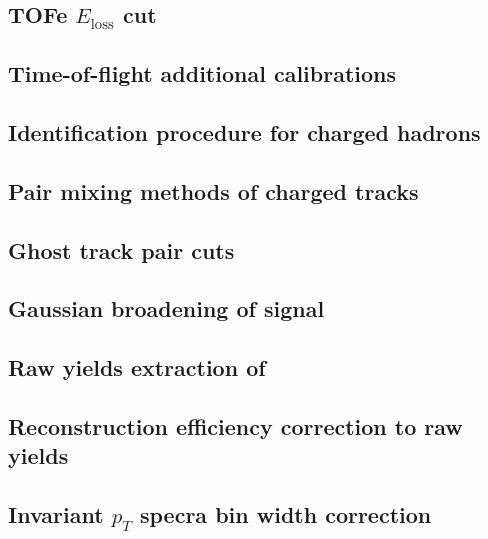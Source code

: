 \subsection{TOFe $E_{\text{loss}}$ cut}
\label{sec:tofe_eloss_cut}


%

\subsection{Time-of-flight additional calibrations}
\label{sec:tof_additional_calibrations}


\subsection{Identification procedure for charged hadrons}
\label{sec:identification_procedure}


\subsection{Pair mixing methods of charged tracks}
\label{sec:pair_mixing_methods}


\subsection{Ghost track pair cuts}
\label{sec:ghost_cuts}


\subsection{Gaussian broadening of \kstar signal}
\label{sec:gaussian_broadening}


\subsection{Raw yields extraction of \kstar}
\label{sec:raw_yields_extraction}


\subsection{Reconstruction efficiency correction to \kstar raw yields}
\label{sec:reconstruction_eff}


\subsection{Invariant $p_T$ specra bin width correction}
\label{sec:bin_width_correction}

